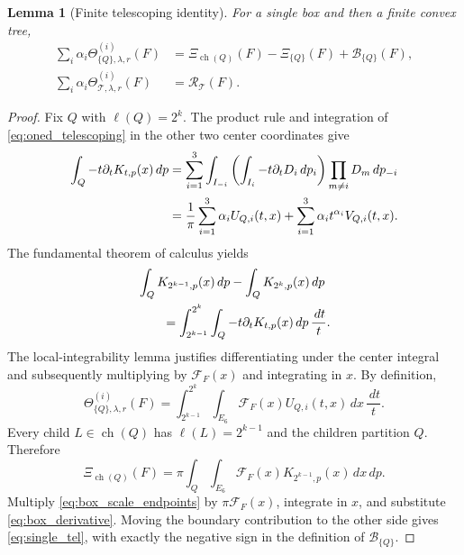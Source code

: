 \documentclass[12pt,reqno]{amsart}
\theoremstyle{plain}
\newtheorem{lemma}[theorem]{Lemma}
\theoremstyle{definition}
\theoremstyle{remark}
\numberwithin{equation}{section}
\newcommand{\T}{\mathcal T}
\newcommand{\dd}{\,d}
\DeclareMathOperator{\ch}{ch}
\begin{document}
\begin{lemma}[Finite telescoping identity]\label{lem:telescoping_identity}
For a single box and then a finite convex tree,
\begin{align}
 \sum_i\alpha_i\Theta^{(i)}_{\{Q\},\lambda,r}(F)
   &=\Xi_{\ch(Q)}(F)-\Xi_{\{Q\}}(F)+\mathcal B_{\{Q\}}(F),\label{eq:single_tel}\\
 \sum_i\alpha_i\Theta^{(i)}_{\T,\lambda,r}(F)&=\mathcal R_\T(F).
                                                        \label{eq:tree_tel}
\end{align}
\end{lemma}
\begin{proof}
Fix $Q$ with $\ell(Q)=2^k$. The product rule and integration of
\eqref{eq:oned_telescoping} in the other two center coordinates give
\begin{align}
 \int_Q-t\partial_tK_{t,p}(x)\dd p
 &=\sum_{i=1}^3\int_{I_{-i}}
     \left(\int_{I_i}-t\partial_tD_i\dd p_i\right)
                       \prod_{m\ne i}D_m\dd p_{-i}\notag\\
 &=\frac1\pi\sum_{i=1}^3\alpha_iU_{Q,i}(t,x)
       +\sum_{i=1}^3\alpha_it^{\alpha_i}V_{Q,i}(t,x).
                                                    \label{eq:box_derivative}
\end{align}
The fundamental theorem of calculus yields
\begin{align}
 &\int_QK_{2^{k-1},p}(x)\dd p-\int_QK_{2^k,p}(x)\dd p\notag\\
 &\qquad=\int_{2^{k-1}}^{2^k}\int_Q-t\partial_tK_{t,p}(x)
                                      \dd p\,\frac{\dd t}{t}.
                                                    \label{eq:box_scale_endpoints}
\end{align}
The local-integrability lemma justifies differentiating under the
center integral and subsequently multiplying by $\mathcal F_F(x)$
and integrating in $x$. By definition,
\[
 \Theta^{(i)}_{\{Q\},\lambda,r}(F)
 =\int_{2^{k-1}}^{2^k}\int_{E_6}
       \mathcal F_F(x)U_{Q,i}(t,x)\dd x\,\frac{\dd t}{t}.
\]
Every child $L\in\ch(Q)$ has $\ell(L)=2^{k-1}$ and the children
partition $Q$. Therefore
\[
 \Xi_{\ch(Q)}(F)
 =\pi\int_Q\int_{E_6}\mathcal F_F(x)K_{2^{k-1},p}(x)\dd x\dd p.
\]
Multiply \eqref{eq:box_scale_endpoints} by $\pi\mathcal F_F(x)$,
integrate in $x$, and substitute \eqref{eq:box_derivative}. Moving
the boundary contribution to the other side gives
\eqref{eq:single_tel}, with exactly the negative sign in the
definition of $\mathcal B_{\{Q\}}$.


\end{proof}
\end{document}
